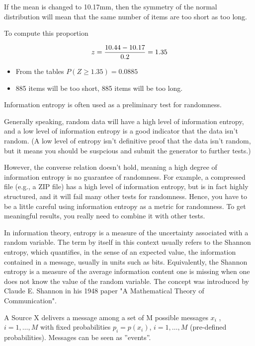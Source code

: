 \begin{frame}
If the mean is changed to 10.17mm, then the symmetry of the normal distribution will mean that the same number of items are too short as too long.

To compute this proportion

\[ z = {10.44 - 10.17 \over 0.2} = 1.35 \]

\begin{itemize}
\item From the tables $P(Z \geq 1.35) = 0.0885$

\item 885 items will be too short, 885 items will be too long.
\end{itemize}
\end{frame}





\begin{frame}
Information entropy is often used as a preliminary test for randomness. 


Generally speaking, random data will have a high level of information entropy, and a low level of information entropy is a 
good indicator that the data isn't random. 
(A low level of entropy isn't definitive proof that the data isn't random, but it means you should be suspcious and submit the generator to further tests.)


However, the converse relation doesn't hold, meaning a high degree of 
information entropy is no guarantee of randomness. 
For example, a compressed file (e.g., a ZIP file) has a high level of information entropy, but is 
in fact highly structured, and it will fail many other tests for randomness. 
Hence, you have to be a little careful using information entropy as a metric for randomness. 
To get meaningful results, you really need to combine it with other tests.
\end{frame}






\begin{frame}
In information theory, entropy is a measure of the uncertainty associated with a random variable. 
The term by itself in this context usually refers to the Shannon entropy, which quantifies, in the 
sense of an expected value, the information contained in a message, usually in units such as bits. 
Equivalently, the Shannon entropy is a measure of the average information content one is missing 
when one does not know the value of the random variable. 
The concept was introduced by Claude E. Shannon in his 1948 paper "A Mathematical Theory of Communication".


A Source X delivers a message among a set of M possible messages $x_i$ , $i = 1, \ldots ,M$
with fixed probabilities $p_i = p(x_i)$,  $i = 1, \ldots ,M$ (pre-defined probabilities).
Messages can be seen as ”events”.
\end{frame}


